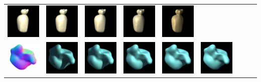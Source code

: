 \begin{center}
\begin{longtable}{@{}c@{}c@{}c@{}c@{}c@{}c@{}c@{}c@{}c@{}}
\includegraphics[width=0.1\linewidth]{training/16_3.png} & \includegraphics[width=0.1\linewidth]{training/16_4.png} &
\includegraphics[width=0.1\linewidth]{training/16_5.png} & \includegraphics[width=0.1\linewidth]{training/16_6.png} &
\includegraphics[width=0.1\linewidth]{training/16_7.png} \\
\includegraphics[width=0.1\linewidth]{training/17_gt.png} & \includegraphics[width=0.1\linewidth]{training/17_0.png} &
\includegraphics[width=0.1\linewidth]{training/17_1.png} & \includegraphics[width=0.1\linewidth]{training/17_2.png} &
\includegraphics[width=0.1\linewidth]{training/17_3.png} & \includegraphics[width=0.1\linewidth]{training/17_4.png} &

\end{longtable}
\end{center}
